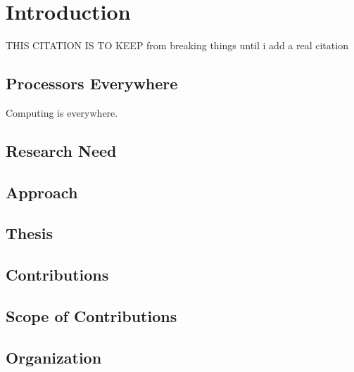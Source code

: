 \section{Introduction}   \label{chap:introduction}

THIS CITATION IS TO KEEP from breaking things until i add a real citation
\cite{WSULibrary}

\subsection{Processors Everywhere}

Computing is everywhere.


\subsection{Research Need}

\subsection{Approach}

\subsection{Thesis}

\subsection{Contributions}

\subsection{Scope of Contributions}

\subsection{Organization}